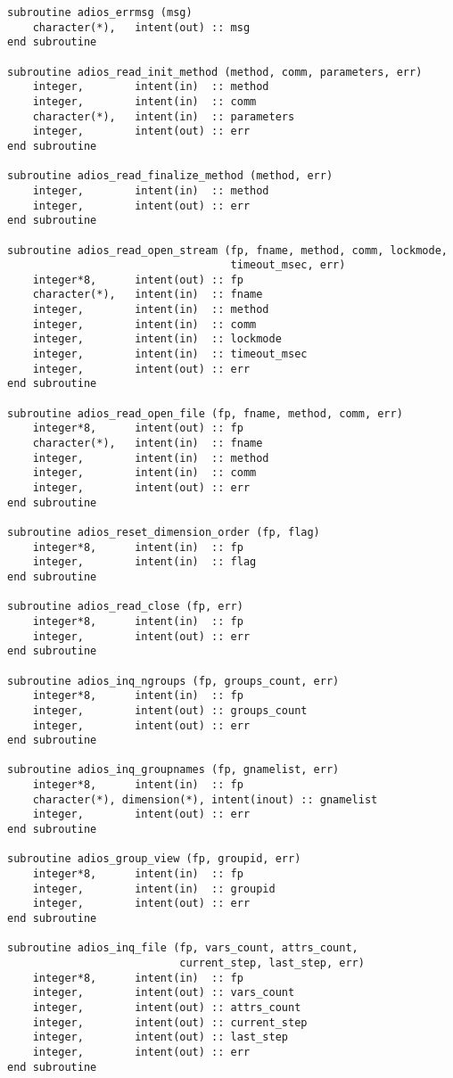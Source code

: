 \begin{lstlisting}[language=ADIOS,alsolanguage=Fortran]
subroutine adios_errmsg (msg)
    character(*),   intent(out) :: msg
end subroutine

subroutine adios_read_init_method (method, comm, parameters, err)
    integer,        intent(in)  :: method
    integer,        intent(in)  :: comm
    character(*),   intent(in)  :: parameters
    integer,        intent(out) :: err
end subroutine

subroutine adios_read_finalize_method (method, err)
    integer,        intent(in)  :: method
    integer,        intent(out) :: err
end subroutine

subroutine adios_read_open_stream (fp, fname, method, comm, lockmode, 
                                   timeout_msec, err)
    integer*8,      intent(out) :: fp
    character(*),   intent(in)  :: fname
    integer,        intent(in)  :: method
    integer,        intent(in)  :: comm
    integer,        intent(in)  :: lockmode
    integer,        intent(in)  :: timeout_msec
    integer,        intent(out) :: err
end subroutine

subroutine adios_read_open_file (fp, fname, method, comm, err)
    integer*8,      intent(out) :: fp
    character(*),   intent(in)  :: fname
    integer,        intent(in)  :: method
    integer,        intent(in)  :: comm
    integer,        intent(out) :: err
end subroutine

subroutine adios_reset_dimension_order (fp, flag)
    integer*8,      intent(in)  :: fp
    integer,        intent(in)  :: flag
end subroutine

subroutine adios_read_close (fp, err)
    integer*8,      intent(in)  :: fp
    integer,        intent(out) :: err
end subroutine

subroutine adios_inq_ngroups (fp, groups_count, err)
    integer*8,      intent(in)  :: fp
    integer,        intent(out) :: groups_count
    integer,        intent(out) :: err
end subroutine

subroutine adios_inq_groupnames (fp, gnamelist, err)
    integer*8,      intent(in)  :: fp
    character(*), dimension(*), intent(inout) :: gnamelist
    integer,        intent(out) :: err
end subroutine

subroutine adios_group_view (fp, groupid, err)
    integer*8,      intent(in)  :: fp
    integer,        intent(in)  :: groupid
    integer,        intent(out) :: err
end subroutine

subroutine adios_inq_file (fp, vars_count, attrs_count, 
                           current_step, last_step, err)
    integer*8,      intent(in)  :: fp
    integer,        intent(out) :: vars_count
    integer,        intent(out) :: attrs_count
    integer,        intent(out) :: current_step
    integer,        intent(out) :: last_step
    integer,        intent(out) :: err
end subroutine


\end{lstlisting}

